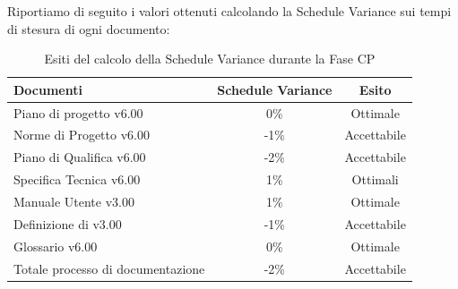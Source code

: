 Riportiamo di seguito i valori ottenuti calcolando la Schedule Variance sui tempi di stesura di ogni documento:
			\begin{table}[H]
					\centering
					\begin{tabu}{| l | c | c |}
							\hline
							Documenti 							& Schedule Variance	& Esito		\\ \hline \hline
							
							Piano di progetto v6.00				& 0\% 		& Ottimale  \\ \hline
							Norme di Progetto v6.00 			& -1\%		& Accettabile  \\ \hline
							Piano di Qualifica v6.00 			& -2\%		& Accettabile  \\ \hline
							Specifica Tecnica v6.00 			& 1\%		& Ottimali  \\ \hline
							Manuale Utente v3.00 			& 1\%		& Ottimale  \\ \hline
							Definizione di  v3.00 			& -1\%		& Accettabile  \\ \hline
							Glossario v6.00					 	& 0\% 		& Ottimale  \\ \hline
							Totale processo di documentazione & -2\% & Accettabile \\ \hline
						\end{tabu}
					\caption{Esiti del calcolo della Schedule Variance durante la Fase CP}
				\end{table}
				
